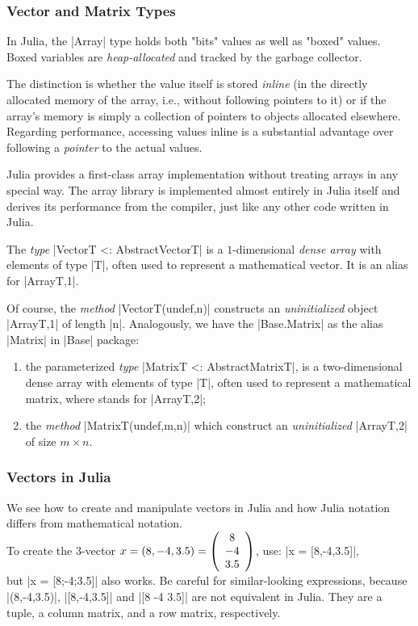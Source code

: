 \subsubsection*{Vector and Matrix Types}

In Julia, the |Array| type holds both "bits" values as well as "boxed" values. Boxed variables are \emph{heap-allocated}  and tracked by the garbage collector. 

The distinction is whether the value itself is stored \emph{inline} (in the directly allocated memory of the array, i.e., without following pointers to it) or if the array's memory is simply a collection of pointers to objects allocated elsewhere. 
Regarding performance, accessing values {inline} is a substantial advantage over following a \emph{pointer} to the actual values. 

Julia provides a first-class array implementation without treating arrays in any special way. The array library is implemented almost entirely in Julia itself and derives its performance from the compiler, just like any other code written in Julia. 



The \emph{type} |Vector{T} <: AbstractVector{T}| is a $1$-dimensional \emph{dense array} with elements of type |T|, often used to represent a mathematical vector. It is an alias for |Array{T,1}|. 

Of course, the \emph{method} |Vector{T}(undef,n)| constructs an \emph{uninitialized} object |Array{T,1}| of length |n|.
Analogously, we have the |Base.Matrix| as the alias |Matrix| in |Base| package:
\begin{enumerate}
\item
the parameterized \emph{type} |Matrix{T} <: AbstractMatrix{T}|, is a two-dim\-ensional dense array with elements of type |T|, often used to represent a mathematical matrix, where stands for |Array{T,2}|;  
\item
the \emph{method} |Matrix{T}(undef,m,n)| which construct an \emph{uninitialized} |Array{T,2}| of size $m\times n$.
\end{enumerate}


\subsubsection*{Vectors in Julia}

We see how to create and manipulate vectors in Julia and how Julia notation differs from mathematical notation.\\
To create the 3-vector
$x=(8,-4,3.5)= {\left(\begin{array}{ccccccc}8\\-4\\3.5\end{array}\right)}$, use: 
|x = [8,-4,3.5]|,\\ but |x = [8;-4;3.5]| also works. Be careful for similar-looking expressions, because 
|(8,-4,3.5)|, |[8,-4,3.5]| and |[8 -4 3.5]| are not equivalent in Julia. They are a tuple, a column matrix, and a row matrix, respectively.

